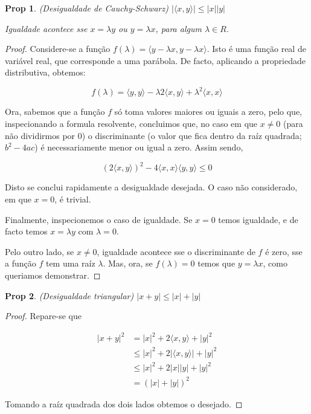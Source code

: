 \documentclass{article}
\newtheorem{prop}{Prop}
\theoremstyle{definition}
\begin{document}
	\begin{prop}
	(Desigualdade de Cauchy-Schwarz) $\lvert \langle x, y \rangle \rvert \leq \lvert x \rvert \lvert y \rvert$
	
	Igualdade acontece sse $x = \lambda y$ ou $y = \lambda x$, para algum $\lambda \in R$.
	\end{prop}
	
	\begin{proof}
	Considere-se a função $f(\lambda) = \langle y - \lambda x, y - \lambda x \rangle$. Isto é uma função real de variável real, que corresponde a uma parábola. De facto, aplicando a propriedade distributiva, obtemos:
	
	\[f(\lambda) = \langle y, y \rangle - \lambda 2 \langle x, y \rangle + \lambda^2 \langle x, x \rangle\]
	
	Ora, sabemos que a função $f$ só toma valores maiores ou iguais a zero, pelo que, inspecionando a formula resolvente, concluimos que, no caso em que $x \neq 0$ (para não dividirmos por 0) o discriminante (o valor que fica dentro da raíz quadrada; $b^2 - 4 a c$) é necessariamente menor ou igual a zero. Assim sendo,
	
	\[(2 \langle x, y \rangle) ^2 - 4 \langle x, x \rangle \langle y, y \rangle \leq 0\]
	
	Disto se conclui rapidamente a desigualdade desejada. O caso não considerado, em que $x = 0$, é trivial.
	
	Finalmente, inspecionemos o caso de igualdade. Se $x = 0$ temos igualdade, e de facto temos $x = \lambda y$ com $\lambda = 0$.
	
	Pelo outro lado, se $x \neq 0$, igualdade acontece sse o discriminante de $f$ é zero, sse a função $f$ tem uma raíz $\lambda$. Mas, ora, se $f(\lambda) = 0$ temos que $y = \lambda x$, como queriamos demonstrar.
	\end{proof}
	
	\begin{prop}
	(Desigualdade triangular) $\lvert x + y \rvert \leq \lvert x \rvert + \lvert y \rvert$
	\end{prop}
	
	\begin{proof}
	Repare-se que
	
	\begin{align*}
	\lvert x + y \rvert ^2 &= \lvert x \rvert ^2 + 2 \langle x, y \rangle + \lvert y \rvert ^2 \\
	&\leq \lvert x \rvert ^2 + 2 \lvert \langle x, y \rangle \rvert + \lvert y \rvert ^2 \\
	&\leq \lvert x \rvert ^2 + 2 \lvert x \rvert \lvert y \rvert + \lvert y \rvert ^2 \\
	&= (\lvert x \rvert + \lvert y \rvert)^2
	\end{align*}
	
	Tomando a raíz quadrada dos dois lados obtemos o desejado.
	\end{proof}
	
\end{document}
